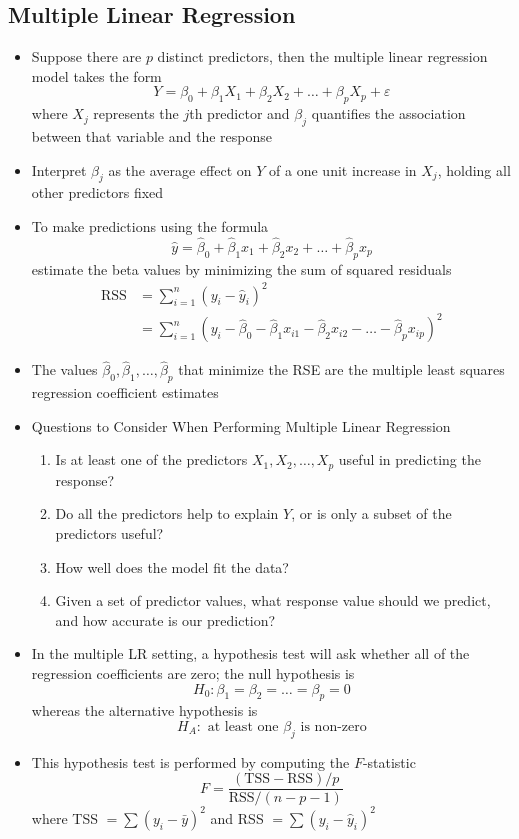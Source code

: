 \documentclass[12pt]{article}
\begin{document}
\subsection{Multiple Linear Regression}
\begin{itemize}
\item Suppose there are $p$ distinct predictors, then the multiple linear regression model takes the form
$$ Y = \beta_0 + \beta_1X_1 + \beta_2X_2 + \dots + \beta_pX_p + \varepsilon $$ where $X_j$ represents the $j$th predictor and $\beta_j$ quantifies the association between that variable and the response 
\item Interpret $\beta_j$ as the average effect on $Y$ of a one unit increase in $X_j$, holding all other predictors fixed 
\item To make predictions using the formula $$ \hat{y} = \hat{\beta}_0 + \hat{\beta}_1x_1 + \hat{\beta}_2x_2 + \dots + \hat{\beta}_px_p$$ estimate the beta values by minimizing the sum of squared residuals 
$$ \begin{aligned} \text{RSS} &= \sum_{i=1}^n (y_i - \hat{y}_i)^2 \\ &= \sum_{i=1}^n (y_i - \hat{\beta}_0 - \hat{\beta}_1x_{i1} - \hat{\beta}_2x_{i2} - \dots - \hat{\beta}_px_{ip})^2 \end{aligned} $$ 
\item The values $\hat{\beta}_0, \hat{\beta}_1,\dots, \hat{\beta}_p$ that minimize the RSE are the multiple least squares regression coefficient estimates 
\item Questions to Consider When Performing Multiple Linear Regression \begin{enumerate} 
\item Is at least one of the predictors $X_1,X_2,\dots,X_p$ useful in predicting the response? 
\item Do all the predictors help to explain $Y$, or is only a subset of the predictors useful? 
\item How well does the model fit the data? 
\item Given a set of predictor values, what response value should we predict, and how accurate is our prediction? \end{enumerate} 
\item In the multiple LR setting, a hypothesis test will ask whether all of the regression coefficients are zero; the null hypothesis is $$H_0: \beta_1 = \beta_2 = \dots = \beta_p = 0$$ whereas the alternative hypothesis is $$H_A: \text{ at least one $\beta_j$ is non-zero} $$ 
\item This hypothesis test is performed by computing the $F$-statistic $$F = \frac{(\text{TSS} - \text{RSS})/p}{\text{RSS}/(n-p-1)} $$ where TSS $= \sum (y_i - \bar{y})^2$ and RSS $= \sum (y_i - \hat{y}_i)^2$

\end{itemize}
\end{document}
